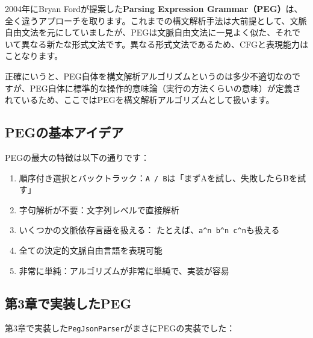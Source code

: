 2004年にBryan Fordが提案した\textbf{Parsing Expression
Grammar（PEG）}は、全く違うアプローチを取ります。これまでの構文解析手法は大前提として、文脈自由文法を元にしていましたが、PEGは文脈自由文法に一見よく似た、それでいて異なる新たな形式文法です。異なる形式文法であるため、CFGと表現能力はことなります。

正確にいうと、PEG自体を構文解析アルゴリズムというのは多少不適切なのですが、PEG自体に標準的な操作的意味論（実行の方法くらいの意味）が定義されているため、ここではPEGを構文解析アルゴリズムとして扱います。

\hypertarget{chapter5-pegux306eux57faux672cux30a2ux30a4ux30c7ux30a2}{%
\subsection{PEGの基本アイデア}\label{chapter5-pegux306eux57faux672cux30a2ux30a4ux30c7ux30a2}}

PEGの最大の特徴は以下の通りです：

\begin{enumerate}
\def\labelenumi{\arabic{enumi}.}
\tightlist
\item
  順序付き選択とバックトラック：\texttt{A\ /\ B}は「まずAを試し、失敗したらBを試す」
\item
  字句解析が不要：文字列レベルで直接解析
\item
  いくつかの文脈依存言語を扱える：
  たとえば、\texttt{a\^{}n\ b\^{}n\ c\^{}n}も扱える
\item
  全ての決定的文脈自由言語を表現可能
\item
  非常に単純：アルゴリズムが非常に単純で、実装が容易
\end{enumerate}

\hypertarget{chapter5-ux7b2c3ux7ae0ux3067ux5b9fux88c5ux3057ux305fpeg}{%
\subsection{第3章で実装したPEG}\label{chapter5-ux7b2c3ux7ae0ux3067ux5b9fux88c5ux3057ux305fpeg}}

第3章で実装した\texttt{PegJsonParser}がまさにPEGの実装でした：

\begin{Shaded}
\begin{Highlighting}[]
 \NormalTok{() \{}
    \NormalTok{ \{}
        \NormalTok{();}
        \NormalTok{();}
         \NormalTok{(} \NormalTok{\textless{}\textgreater{}());}
\NormalTok{    \} }\NormalTok{ (}
        \NormalTok{();}
\NormalTok{    \}}
\NormalTok{\}}
\end{Highlighting}
\end{Shaded}

